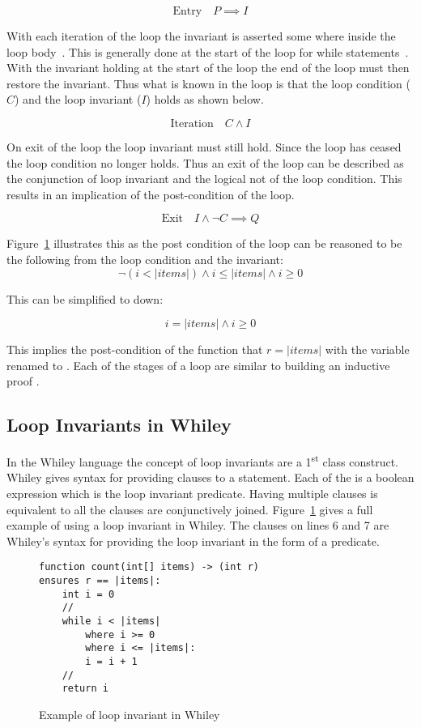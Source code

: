 $$\text{Entry} \quad P \implies I$$

With each iteration of the loop the invariant is asserted some where
inside the loop body~\cite{hoare-logic}.
This is generally done at the start of the loop for while
statements~\cite{whiley-origin}.
With the invariant holding at the start of the loop the end of 
the loop must then restore the invariant.
Thus what is known in the loop is that the loop condition ($C$)
and the loop invariant ($I$) holds as shown below.

$$\text{Iteration} \quad C \wedge I $$

On exit of the loop the loop invariant must still hold.
Since the loop has ceased the loop condition no longer
holds. Thus an exit of the loop can be described
as the conjunction of loop invariant and the logical
not of the loop condition.
This results in an implication of the post-condition of the
loop.

$$\text{Exit} \quad I \wedge \neg{C} \implies Q$$

Figure~\ref{lst:whiley-inv} illustrates this as the
post condition of the loop can be reasoned to be the following
from the loop condition and the invariant:
$$\neg{ ( i < |items| ) } \wedge i \leq |items| \wedge i \geq 0$$

This can be simplified to down:

$$ i = |items| \wedge i \geq 0$$

This implies the post-condition of the function that $r = |items|$ with
the variable  renamed to .
Each of the stages of a loop are similar to building an inductive proof \cite{invarints-classifiction}.

\subsection{Loop Invariants in Whiley}

In the Whiley language the concept of loop invariants are a 1\textsuperscript{st} class
construct.
Whiley gives syntax for providing  clauses to a 
statement.
Each of the  is a boolean expression which is the loop
invariant predicate.
Having multiple  clauses is equivalent to all the clauses are
conjunctively joined.
Figure~\ref{lst:whiley-inv} gives a full example of using a loop invariant
in Whiley. The  clauses on lines 6 and 7 are Whiley's syntax for
providing the loop invariant in the form of a predicate.

\begin{figure}[ht]
\begin{lstlisting}
function count(int[] items) -> (int r)
ensures r == |items|:
    int i = 0
    //
    while i < |items|
        where i >= 0
        where i <= |items|:
        i = i + 1
    //
    return i
\end{lstlisting}
\caption{Example of loop invariant in Whiley}
\label{lst:whiley-inv}
\end{figure}

